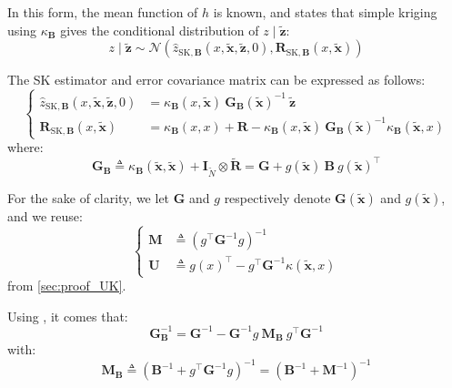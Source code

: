 In this form, the mean function of $h$ is known, and  states that simple kriging using $\kappa_{\mathbf{B}}$ gives the conditional distribution of $z\mid\tilde{\mathbf{z}}$:
\begin{equation}
	z\mid\tilde{\mathbf{z}}\sim\mathcal{N}\left(\hat{z}_{\mathrm{SK},\mathbf{B}}(x,\tilde{\mathbf{x}},\tilde{\mathbf{z}},0),\mathbf{R}_{\mathrm{SK},\mathbf{B}}(x,\tilde{\mathbf{x}})\right)
\end{equation}

The SK estimator and error covariance matrix can be expressed as follows:
\begin{equation}
	\left\{\begin{aligned}
	\hat{z}_{\mathrm{SK},\mathbf{B}}(x,\tilde{\mathbf{x}},\tilde{\mathbf{z}},0)&=\kappa_{\mathbf{B}}(x,\tilde{\mathbf{x}})\:\mathbf{G}_{\mathbf{B}}(\tilde{\mathbf{x}})^{-1}\:\tilde{\mathbf{z}}\\
	\mathbf{R}_{\mathrm{SK},\mathbf{B}}(x,\tilde{\mathbf{x}})&=\kappa_{\mathbf{B}}(x,x)+\mathbf{R}-\kappa_{\mathbf{B}}(x,\tilde{\mathbf{x}})\:\mathbf{G}_{\mathbf{B}}(\tilde{\mathbf{x}})^{-1}\kappa_{\mathbf{B}}\left(\tilde{\mathbf{x}},x\right)
	\end{aligned}\right.
\end{equation}
where:
\begin{equation}
	\mathbf{G}_{\mathbf{B}}\triangleq \kappa_{\mathbf{B}}(\tilde{\mathbf{x}},\tilde{\mathbf{x}})+\mathbf{I}_{\tilde{N}}\otimes\tilde{\mathbf{R}}=\mathbf{G}+g(\tilde{\mathbf{x}})\:\mathbf{B}\:g(\tilde{\mathbf{x}})^\top
\end{equation}

For the sake of clarity, we let $\mathbf{G}$ and $g$ respectively denote $\mathbf{G}(\tilde{\mathbf{x}})$ and $g(\tilde{\mathbf{x}})$, and we reuse:
\begin{equation}
	\left\{\begin{aligned}
	\mathbf{M}&\triangleq\left(g^\top \mathbf{G}^{-1}g\right)^{-1}\\
	\mathbf{U}&\triangleq g(x)^\top-g^\top \mathbf{G}^{-1}\kappa(\tilde{\mathbf{x}},x)
	\end{aligned}\right.
\end{equation}
from \cref{sec:proof_UK}.

Using , it comes that:
\begin{equation}
	\mathbf{G}_{\mathbf{B}}^{-1}=\mathbf{G}^{-1}-\mathbf{G}^{-1}g\:\mathbf{M}_{\mathbf{B}}\:g^\top \mathbf{G}^{-1}
\end{equation}
with:
\begin{equation}
	\mathbf{M}_{\mathbf{B}}\triangleq\left(\mathbf{B}^{-1}+g^\top \mathbf{G}^{-1}g\right)^{-1}=\left(\mathbf{B}^{-1}+\mathbf{M}^{-1}\right)^{-1}
\end{equation}

